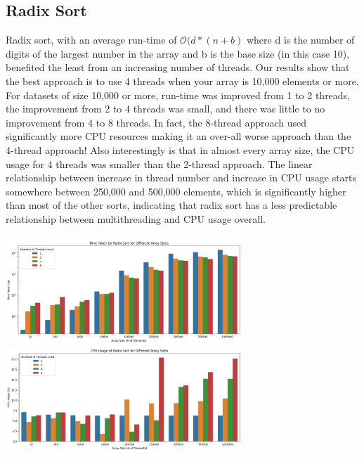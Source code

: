 \documentclass[conference]{IEEEtran}
\begin{document}
\subsection{Radix Sort}
Radix sort, with an average run-time of $\mathcal{O}(d*(n+b)$ where d is the number of digits of the largest number in the array and b is the base size (in this case 10), benefited the least from an increasing number of threads. Our results show that the best approach is to use 4 threads when your array is 10,000 elements or more. 
For datasets of size 10,000 or more, run-time was improved from 1 to 2 threads, the improvement from 2 to 4 threads was small, and there was little to no improvement from 4 to 8 threads. In fact, the 8-thread approach used significantly more CPU resources making it an over-all worse approach than the 4-thread approach! Also interestingly is that in almost every array size, the CPU usage for 4 threads was smaller than the 2-thread approach. The linear relationship between increase in thread number and increase in CPU usage starts somewhere between 250,000 and 500,000 elements, which is significantly higher than most of the other sorts, indicating that radix sort has a less predictable relationship between multithreading and CPU usage overall. 
\\\\
\includegraphics[width=3.5in]{RadixSortTimeTaken.png}
\includegraphics[width=3.5in]{RadixSortCPUUsage.png}
\end{document}

